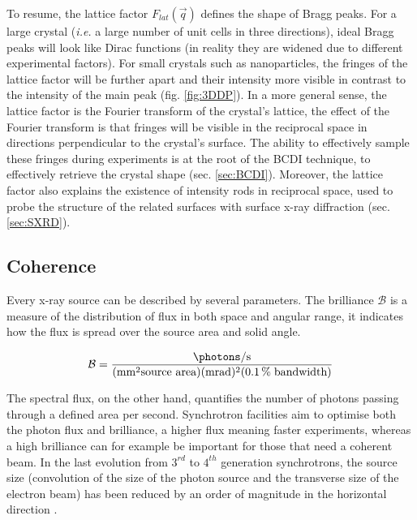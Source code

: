 To resume, the lattice factor $F_{lat}(\vec{q})$ defines the shape of Bragg peaks.
For a large crystal (\textit{i.e.} a large number of unit cells in three directions), ideal Bragg peaks will look like Dirac functions (in reality they are widened due to different experimental factors).
For small crystals such as nanoparticles, the fringes of the lattice factor will be further apart and their intensity more visible in contrast to the intensity of the main peak (fig. \ref{fig:3DDP}).
In a more general sense, the lattice factor is the Fourier transform of the crystal's lattice, the effect of the Fourier transform is that fringes will be visible in the reciprocal space in directions perpendicular to the crystal's surface.
The ability to effectively sample these fringes during experiments is at the root of the BCDI technique, to effectively retrieve the crystal shape (sec. \ref{sec:BCDI}).
Moreover, the lattice factor also explains the existence of intensity rods in reciprocal space, used to probe the structure of the related surfaces with surface x-ray diffraction (sec. \ref{sec:SXRD}).

\subsection{Coherence} \label{sec:Coherence}

Every x-ray source can be described by several parameters.
The brilliance $\mathcal{B}$ is a measure of the distribution of flux in both space and angular range, it indicates how the flux is spread over the source area and solid angle.

\begin{equation}
    \mathcal{B} = \frac{\unit{\photons \per \second}}{(\unit{\mm^2} \text{source area})(\unit{\milli\radian})^2(\qty{0.1}{\percent} \; \text{bandwidth})}
\end{equation}

The spectral flux, on the other hand, quantifies the number of photons passing through a defined area per second.
Synchrotron facilities aim to optimise both the photon flux and brilliance, a higher flux meaning faster experiments, whereas a high brilliance can for example be important for those that need a coherent beam.
In the last evolution from $3^{rd}$ to $4^{th}$ generation synchrotrons, the source size (convolution of the size of the photon source and the transverse size of the electron beam) has been reduced by an order of magnitude in the horizontal direction \parencite{Willmott}.

